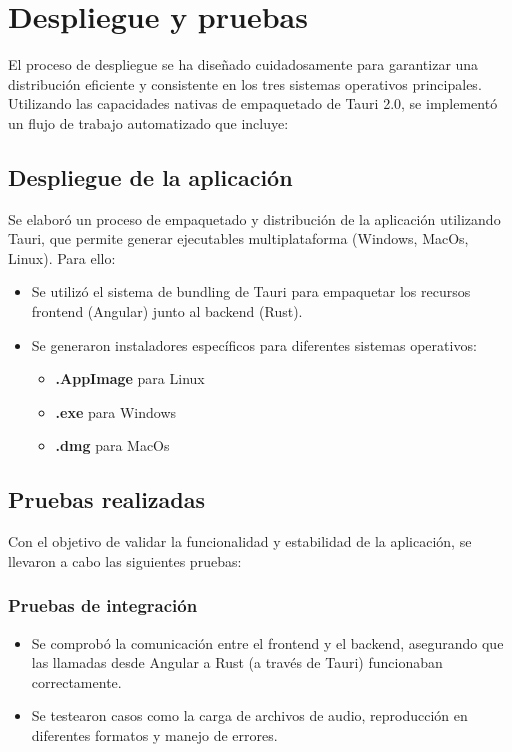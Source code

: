 \documentclass[11pt, a4paper]{article}
\begin{document}
\section{Despliegue y pruebas}

El proceso de despliegue se ha diseñado cuidadosamente para garantizar una distribución eficiente y consistente en los tres sistemas operativos principales. Utilizando las capacidades nativas de empaquetado de Tauri 2.0, se implementó un flujo de trabajo automatizado que incluye:

        \subsection{Despliegue de la aplicación}

        Se elaboró un proceso de empaquetado y distribución de la aplicación utilizando Tauri, que permite generar ejecutables multiplataforma (Windows, MacOs, Linux). Para ello:

        \begin{itemize}
            \item Se utilizó el sistema de bundling de Tauri para empaquetar los recursos frontend (Angular) junto al backend (Rust).
            \item Se generaron instaladores específicos para diferentes sistemas operativos: \begin{itemize}
                \item \textbf{.AppImage} para Linux
                \item \textbf{.exe} para Windows
                \item \textbf{.dmg} para MacOs
                \end{itemize}
        \end{itemize}

        \subsection{Pruebas realizadas}

        Con el objetivo de validar la funcionalidad y estabilidad de la aplicación, se llevaron a cabo las siguientes pruebas:

            \subsubsection{Pruebas de integración}

            \begin{itemize}
                \item Se comprobó la comunicación entre el frontend y el backend, asegurando que las llamadas desde Angular a Rust (a través de Tauri) funcionaban correctamente.
                \item Se testearon casos como la carga de archivos de audio, reproducción en diferentes formatos y manejo de errores.
            \end{itemize}
\end{document}
